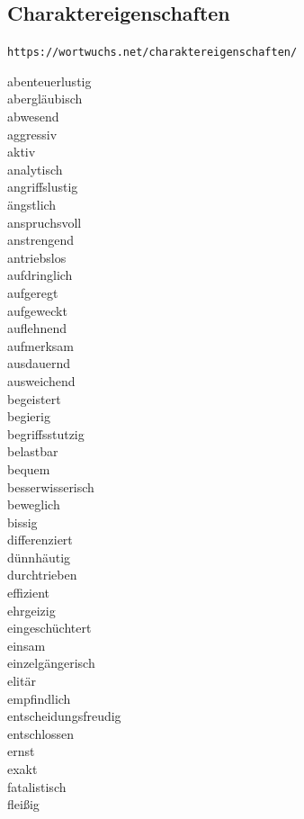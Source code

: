 \documentclass[10pt,a4paper]{article}
\begin{document}
\subsection{Charaktereigenschaften}

\verb+https://wortwuchs.net/charaktereigenschaften/+

abenteuerlustig \\
abergläubisch \\
abwesend \\
aggressiv \\
aktiv \\
analytisch \\
angriffslustig \\
ängstlich \\
anspruchsvoll \\
anstrengend \\
antriebslos \\
aufdringlich \\
aufgeregt \\
aufgeweckt \\
auflehnend \\
aufmerksam \\
ausdauernd \\
ausweichend \\
begeistert \\
begierig \\
begriffsstutzig \\
belastbar \\
bequem \\
besserwisserisch \\
beweglich \\
bissig \\
differenziert \\
dünnhäutig \\
durchtrieben \\
effizient \\
ehrgeizig \\
eingeschüchtert \\
einsam \\
einzelgängerisch \\
elitär \\
empfindlich \\
entscheidungsfreudig \\
entschlossen \\
ernst \\
exakt \\
fatalistisch \\
fleißig \\
\end{document}

